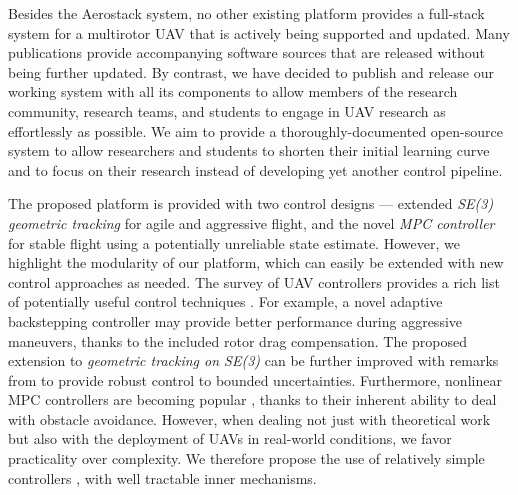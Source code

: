\documentclass[a4paper,11pt,titlepage,twoside]{book}
\begin{document}
Besides the Aerostack system, no other existing platform provides a full-stack system for a multirotor \ac{UAV} that is actively being supported and updated.
Many publications provide accompanying software sources that are released without being further updated.
By contrast, we have decided to publish and release our working system with all its components to allow members of the research community, research teams, and students to engage in \ac{UAV} research as effortlessly as possible.
We aim to provide a thoroughly-documented open-source system to allow researchers and students to shorten their initial learning curve and to focus on their research instead of developing yet another control pipeline.

The proposed platform is provided with two control designs --- extended \emph{SE(3) geometric tracking} \cite{lee2010geometric} for agile and aggressive flight, and the novel \emph{MPC controller} for stable flight using a potentially unreliable state estimate.
However, we highlight the modularity of our platform, which can easily be extended with new control approaches as needed.
The survey of UAV controllers provides a rich list of potentially useful control techniques \cite{nascimento2019position}.
For example, a novel adaptive backstepping controller \cite{zhang2019robust, labbadi2019robust} may provide better performance during aggressive maneuvers, thanks to the included rotor drag compensation.
The proposed extension to \emph{geometric tracking on SE(3)} \cite{lee2010geometric} can be further improved with remarks from \cite{lee2013nonlinear} to provide robust control to bounded uncertainties.
Furthermore, nonlinear \ac{MPC} controllers are becoming popular \cite{nascimento2019nmpc, pereira2019nonlinear, kamel2017robust}, thanks to their inherent ability to deal with obstacle avoidance.
However, when dealing not just with theoretical work but also with the deployment of \acp{UAV} in real-world conditions, we favor practicality over complexity.
We therefore propose the use of relatively simple controllers \cite{baca2020mrs}, with well tractable inner mechanisms.

\end{document}
